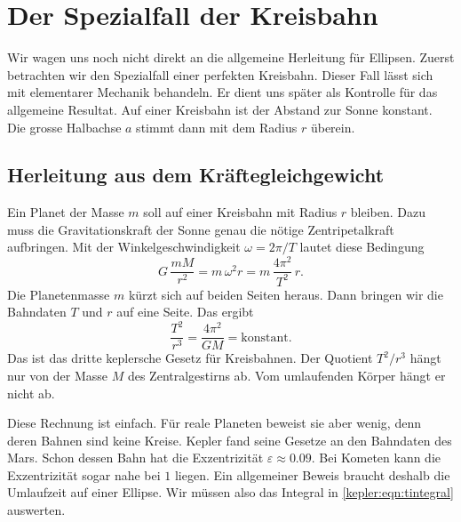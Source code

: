 %
%
%
\section{Der Spezialfall der Kreisbahn
\label{kepler:section:kreisbahn}}

Wir wagen uns noch nicht direkt an die allgemeine Herleitung für Ellipsen.
Zuerst betrachten wir den Spezialfall einer perfekten Kreisbahn.
Dieser Fall lässt sich mit elementarer Mechanik behandeln.
Er dient uns später als Kontrolle für das allgemeine Resultat.
Auf einer Kreisbahn ist der Abstand zur Sonne konstant.
Die grosse Halbachse $a$ stimmt dann mit dem Radius $r$ überein.

\subsection{Herleitung aus dem Kräftegleichgewicht
\label{kepler:subsection:kraeftegleichgewicht}}
%

Ein Planet der Masse $m$ soll auf einer Kreisbahn mit Radius $r$ bleiben.
Dazu muss die Gravitationskraft der Sonne genau die nötige Zentripetalkraft aufbringen.
%
Mit der Winkelgeschwindigkeit $\omega=2\pi/T$ lautet diese Bedingung
%
\begin{equation}
G\,\frac{mM}{r^2}
=
m\,\omega^2 r
=
m\,\frac{4\pi^2}{T^2}\,r.
\label{kepler:eqn:gleichgewicht}
\end{equation}
Die Planetenmasse $m$ kürzt sich auf beiden Seiten heraus.
Dann bringen wir die Bahndaten $T$ und $r$ auf eine Seite.
Das ergibt
\begin{equation}
\frac{T^2}{r^3}
=
\frac{4\pi^2}{GM}
=
\text{konstant}.
\label{kepler:eqn:kreisbahn}
\end{equation}
Das ist das dritte keplersche Gesetz für Kreisbahnen.
Der Quotient $T^2/r^3$ hängt nur von der Masse $M$ des Zentralgestirns ab.
%
Vom umlaufenden Körper hängt er nicht ab.

Diese Rechnung ist einfach.
Für reale Planeten beweist sie aber wenig, denn deren Bahnen sind keine Kreise.
Kepler fand seine Gesetze an den Bahndaten des Mars.
Schon dessen Bahn hat die Exzentrizität $\varepsilon\approx 0.09$.
Bei Kometen kann die Exzentrizität sogar nahe bei $1$ liegen.
Ein allgemeiner Beweis braucht deshalb die Umlaufzeit auf einer Ellipse.
Wir müssen also das Integral in \eqref{kepler:eqn:tintegral} auswerten.

